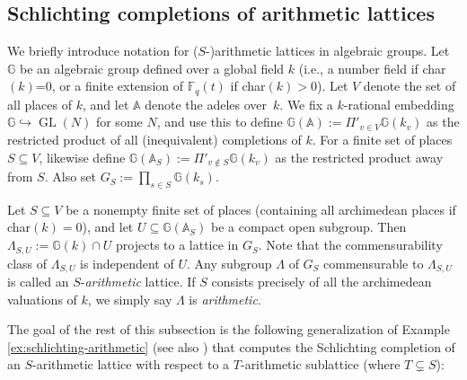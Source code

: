 \documentclass[11pt]{article}
\newcommand{\ie}{i.e.,\xspace}
\numberwithin{equation}{section}\providecommand{\llangle}{\langle\!\langle}\providecommand{\rrangle}{\rangle\!\rangle}\providecommand{\Asterisk}{\ast}
\newcommand{\bbA}{\ensuremath{\mathbb{A}}}
\newcommand{\bbF}{\ensuremath{\mathbb{F}}}
\newcommand{\bbG}{\ensuremath{\mathbb{G}}}
\DeclareMathOperator{\GL}{GL}
\theoremstyle{definition}
\begin{document}
\subsection{Schlichting completions of arithmetic lattices}\label{sec:notation-arithmetic} We briefly introduce notation for ($S$-)arithmetic lattices in algebraic groups. Let $\bbG$ be an algebraic group defined over a global field $k$ (\ie a number field if char$(k)$=0, or a finite extension of $\bbF_q(t)$ if char$(k)>0$). Let $V$ denote the set of all places of $k$, and let $\bbA$ denote the adeles over~$k$. We fix a $k$-rational embedding $\bbG\hookrightarrow \GL(N)$ for some $N$, and use this to define $\bbG(\bbA):=\Pi'_{v\in V} \bbG(k_v)$ as the restricted product of all (inequivalent) completions of $k$. For a finite set of places $S\subseteq V$, likewise define $\bbG(\bbA_S):=\Pi'_{v\notin S} \bbG(k_v)$ as the restricted product away from $S$. Also set $G_S:=\prod_{s\in S} \bbG(k_s)$.

Let $S\subseteq V$ be a nonempty finite set of places (containing all archimedean places if char$(k)=0$), and let $U\subseteq \bbG(\bbA_S)$ be a compact open subgroup. Then $\Lambda_{S,U}:=\bbG(k)\cap U$ projects to a lattice in $G_S$. Note that the commensurability class of $\Lambda_{S,U}$ is independent of $U$. Any subgroup $\Lambda$ of $G_S$ commensurable to $\Lambda_{S,U}$ is called an $S$\nobreakdash-\emph{arithmetic} lattice. If $S$ consists precisely of all the archimedean valuations of $k$, we simply say $\Lambda$ is \emph{arithmetic}.

The goal of the rest of this subsection is the following generalization of Example \ref{ex:schlichting-arithmetic} (see also \cite[3.11]{shalom-willis}) that computes the Schlichting completion of an $S$-arithmetic lattice with respect to a $T$-arithmetic sublattice (where $T\subsetneq S$):
\end{document}
